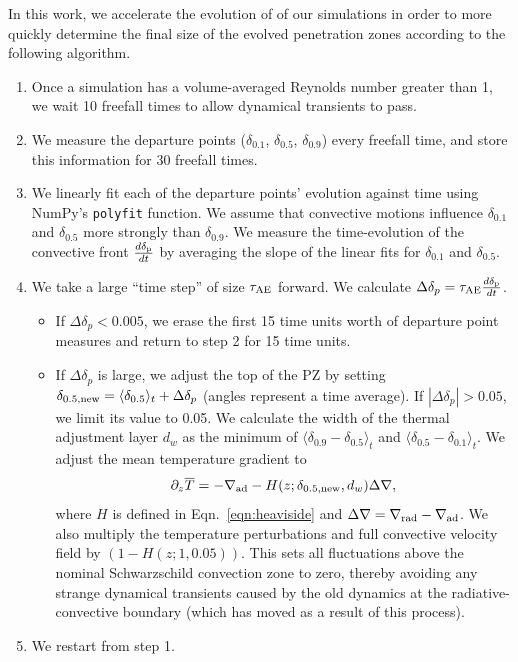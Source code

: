 \documentclass[twocolumn]{aastex631}
\newcommand{\gradrad}{\ensuremath{\nabla_{\rm{rad}}}}
\newcommand{\gradad}{\ensuremath{\nabla_{\rm{ad}}}}
\newcommand{\justgrad}{\ensuremath{\nabla}}
\newcommand{\delp}{\ensuremath{\delta_{\rm{p}}}}
\newcommand{\angles}[1]{\langle #1 \rangle}
\begin{document}
In this work, we accelerate the evolution of of our simulations in order to more quickly determine the final size of the evolved penetration zones according to the following algorithm.
\begin{enumerate}
\item Once a simulation has a volume-averaged Reynolds number greater than 1, we wait 10 freefall times to allow dynamical transients to pass.
\item We measure the departure points ($\delta_{0.1}$, $\delta_{0.5}$, $\delta_{0.9}$) every freefall time, and store this information for 30 freefall times.
\item We linearly fit each of the departure points' evolution against time using NumPy's \texttt{polyfit} function.
We assume that convective motions influence $\delta_{0.1}$ and $\delta_{0.5}$ more strongly than $\delta_{0.9}$.
We measure the time-evolution of the convective front $\frac{d \delp}{dt}$ by averaging the slope of the linear fits for $\delta_{0.1}$ and $\delta_{0.5}$.
\item We take a large ``time step'' of size $\tau_{\rm{AE}}$ forward.
We calculate $\Delta \delta_p = \tau_{\rm{AE}} \frac{d \delp}{dt}$.
\begin{itemize}
\item If $\Delta \delta_p < 0.005$, we erase the first 15 time units worth of departure point measures and return to step 2 for 15 time units.
\item  If $\Delta \delta_p$ is large, we adjust the top of the PZ by setting $\delta_{0.5,\rm{new}} = \angles{\delta_{0.5}}_t + \Delta \delta_p$ (angles represent a time average).
If $|\Delta \delta_p| > 0.05$, we limit its value to 0.05.
We calculate the width of the thermal adjustment layer $d_w$ as the minimum of $\angles{\delta_{0.9} - \delta_{0.5}}_t$ and $\angles{\delta_{0.5} - \delta_{0.1}}_t$.
We adjust the mean temperature gradient to
\begin{equation}
\partial_z \overline{T} = -\gradad - H(z; \delta_{\rm{0.5,\rm{new}}}, d_w) \Delta\justgrad,
\label{eqn:initial_grad}
\end{equation}
where $H$ is defined in Eqn.~\ref{eqn:heaviside} and $\Delta\justgrad = \gradrad - \gradad$.
We also multiply the temperature perturbations and full convective velocity field by $(1 - H(z; 1, 0.05))$.
This sets all fluctuations above the nominal Schwarzschild convection zone to zero, thereby avoiding any strange dynamical transients caused by the old dynamics at the radiative-convective boundary (which has moved as a result of this process).
\end{itemize}
\item We restart from step 1.
\end{enumerate}
\end{document}

